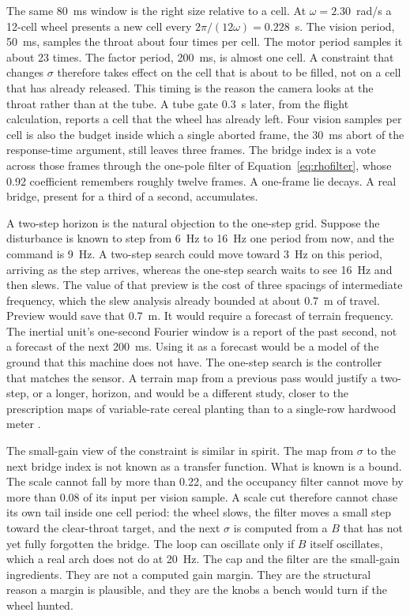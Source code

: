 The same 80~ms window is the right size relative to a cell. At $\omega=2.30$~rad/s a 12-cell wheel presents a new cell every $2\pi/(12\omega)=0.228$~s. The vision period, 50~ms, samples the throat about four times per cell. The motor period samples it about 23 times. The factor period, 200~ms, is almost one cell. A constraint that changes $\sigma$ therefore takes effect on the cell that is about to be filled, not on a cell that has already released. This timing is the reason the camera looks at the throat rather than at the tube. A tube gate 0.3~s later, from the flight calculation, reports a cell that the wheel has already left. Four vision samples per cell is also the budget inside which a single aborted frame, the 30~ms abort of the response-time argument, still leaves three frames. The bridge index is a vote across those frames through the one-pole filter of Equation~\eqref{eq:rhofilter}, whose 0.92 coefficient remembers roughly twelve frames. A one-frame lie decays. A real bridge, present for a third of a second, accumulates.

A two-step horizon is the natural objection to the one-step grid. Suppose the disturbance is known to step from 6~Hz to 16~Hz one period from now, and the command is 9~Hz. A two-step search could move toward 3~Hz on this period, arriving as the step arrives, whereas the one-step search waits to see 16~Hz and then slews. The value of that preview is the cost of three spacings of intermediate frequency, which the slew analysis already bounded at about 0.7~m of travel. Preview would save that 0.7~m. It would require a forecast of terrain frequency. The inertial unit's one-second Fourier window is a report of the past second, not a forecast of the next 200~ms. Using it as a forecast would be a model of the ground that this machine does not have. The one-step search is the controller that matches the sensor. A terrain map from a previous pass would justify a two-step, or a longer, horizon, and would be a different study, closer to the prescription maps of variable-rate cereal planting than to a single-row hardwood meter \cite{stafford2000,gebbers2010,liu2025review}.

The small-gain view of the constraint is similar in spirit. The map from $\sigma$ to the next bridge index is not known as a transfer function. What is known is a bound. The scale cannot fall by more than 0.22, and the occupancy filter cannot move by more than 0.08 of its input per vision sample. A scale cut therefore cannot chase its own tail inside one cell period: the wheel slows, the filter moves a small step toward the clear-throat target, and the next $\sigma$ is computed from a $B$ that has not yet fully forgotten the bridge. The loop can oscillate only if $B$ itself oscillates, which a real arch does not do at 20~Hz. The cap and the filter are the small-gain ingredients. They are not a computed gain margin. They are the structural reason a margin is plausible, and they are the knobs a bench would turn if the wheel hunted.

